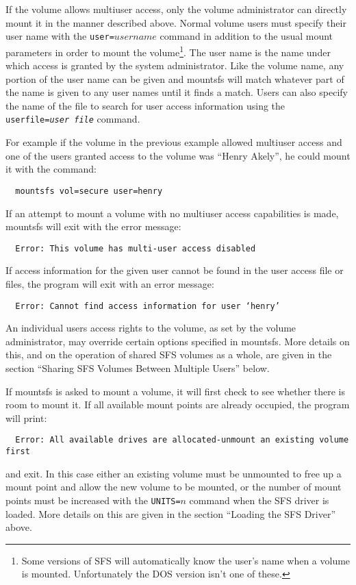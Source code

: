 If the volume allows multiuser access, only the volume administrator can
directly mount it in the manner described above.  Normal volume users must
specify their user name with the {\tt user=$username$} command in addition to the
usual mount parameters in order to mount the volume\footnote{
              Some versions of SFS will automatically know the user's name when
              a volume is mounted.  Unfortunately the DOS version isn't one of
              these.
}.  The user name is the
name under which access is granted by the system administrator.  Like the
volume name, any portion of the user name can be given and mountsfs will match
whatever part of the name is given to any user names until it finds a match.
Users can also specify the name of the file to search for user access
information using the {\tt userfile={\em user file}} command.

For example if the volume in the previous example allowed multiuser access and
one of the users granted access to the volume was ``Henry Akely'', he could mount
it with the command:

{\tt \verb|  |mountsfs vol=secure user=henry}

If an attempt to mount a volume with no multiuser access capabilities is made,
mountsfs will exit with the error message:

{\tt \verb|  |Error: This volume has multi-user access disabled}

If access information for the given user cannot be found in the user access
file or files, the program will exit with an error message:

{\tt \verb|  |Error: Cannot find access information for user `henry'}

An individual users access rights to the volume, as set by the volume
administrator, may override certain options specified in mountsfs.  More
details on this, and on the operation of shared SFS volumes as a whole, are
given in the section ``Sharing SFS Volumes Between Multiple Users'' below.

If mountsfs is asked to mount a volume, it will first check to see whether
there is room to mount it.  If all available mount points are already occupied,
the program will print:

{\small \tt \verb|  |Error:~All available drives are allocated-unmount an existing volume first}

and exit.  In this case either an existing volume must be unmounted to free up
a mount point and allow the new volume to be mounted, or the number of mount
points must be increased with the {\tt UNITS=$n$} command when the SFS driver is 
loaded. More details on this are given in the section ``Loading the SFS Driver'' 
above.

